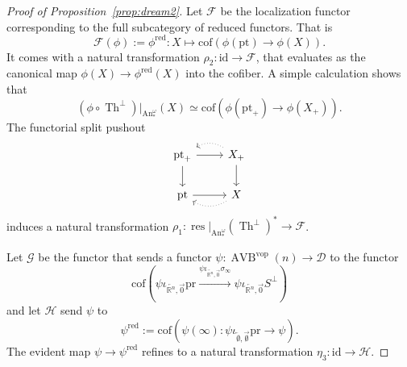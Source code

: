 \documentclass{article}
\newcommand{\xto}{\xrightarrow}
\newcommand{\R}{\mathbb{R}} %
\newcommand{\pt}{\mathrm{pt}}
\newcommand{\vop}{\mathrm{vop}}
\newcommand{\pr}{\mathrm{pr}}
\newcommand{\id}{\mathrm{id}}
\newcommand{\iotaemptyempty}{\iota_{\overleftarrow{\emptyset},\overrightarrow{\emptyset}}}
\newcommand{\iotarnzero}{\iota_{\overleftarrow{\R^n},\overrightarrow{0}}}
\DeclareMathOperator{\AVB}{AVB}
\DeclareMathOperator{\An}{An}
\DeclareMathOperator{\res}{res}
\DeclareMathOperator{\Th}{Th}
\begin{document}
\begin{proof}[Proof of Proposition~\ref{prop:dream2}]
    Let $\mathcal F$ be the localization functor corresponding to the full subcategory of reduced functors. That is 
    \[
      \mathcal F (\phi) := \phi^{\mathrm{red}}\colon X \mapsto \mathrm{cof}\left(\phi(\pt) \to \phi(X)\right).
    \]
    It comes with a natural transformation $\rho_2 \colon \id \to \mathcal F$, that evaluates as the canonical map 
    $\phi(X) \to \phi^\mathrm{red}(X)$ into the cofiber.
    A simple calculation shows that 
    \[
    (\phi \circ \Th^\perp)|_{\An_*^\omega} (X) \simeq \mathrm{cof}(\phi(\pt_+) \to \phi(X_+)).
    \]
    The functorial split pushout 
    \[\begin{tikzcd}
        {\pt_+} & {X_+} \\
        \pt & X
        \arrow[from=1-1, to=1-2]
        \arrow[from=1-1, to=2-1]
        \arrow[from=2-1, to=2-2]
        \arrow[from=1-2, to=2-2]
        \arrow[bend right=30, dotted, from=1-2, to=1-1]
        \arrow[bend left=30, dotted, from=2-2, to=2-1]
    \end{tikzcd}\]
    induces a natural transformation 
    $ \rho_1 \colon \res|_{\An_*^\omega} (\Th^\perp)^* \to \mathcal F$.

    Let $\mathcal G$ be the functor that sends a functor $\psi \colon \AVB^\vop(n) \to \mathcal D$ to the functor 
    \[
    \mathrm{cof}\left(\psi\iotarnzero\pr \xto{\psi\iotarnzero\sigma_\infty}\psi\iotarnzero S^\perp\right)    
    \]
    and let $\mathcal H$ send $\psi$ to 
    \[
    \psi^\mathrm{red} := \mathrm{cof}(\psi(\infty) \colon \psi \iotaemptyempty \pr \to \psi).
    \]
    The evident map $\psi \to \psi^\mathrm{red}$ refines to a natural transformation 
    $\eta_3 \colon \id \to \mathcal H$.


\end{proof}
\end{document}
